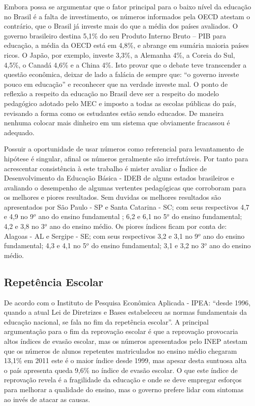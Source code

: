 \documentclass[
	article,			%
	11pt,				%
	oneside,			%
	a4paper,			%
	english,			%
	brazil,				%
	sumario=tradicional
	]{abntex2}
\begin{document}
Embora possa se argumentar que  o fator principal para o baixo nível da educação no Brasil é a falta de investimento, os números informados pela OECD atestam o contrário, que o Brasil já investe mais do que a média dos países avaliados. O governo brasileiro destina 5,1\% do seu Produto Interno Bruto – PIB para educação, a média da OECD está em 4,8\%, e abrange em sumária maioria países ricos. O Japão, por exemplo, investe 3,3\%, a Alemanha 4\%, a Coreia do Sul, 4,5\%, o Canadá 4,6\% e a China 4\%. Isto provar que o debate teve transcender a questão econômica, deixar de lado a falácia de sempre que: “o governo investe pouco em educação” e reconhecer que na verdade investe mal. O ponto de reflexão a respeito da educação no Brasil deve ser a respeito do modelo pedagógico adotado pelo MEC e imposto a todas as escolas públicas do país, revisando a forma como os estudantes estão sendo educados. De maneira nenhuma  colocar mais dinheiro em um sistema que obviamente fracassou é adequado.  

Possuir a oportunidade de usar números como referencial para levantamento de hipótese é singular, afinal os números geralmente são irrefutáveis. Por tanto para acrescentar consistência à este trabalho é mister avaliar o Índice de Desenvolvimento da Educação Básica - IDEB de alguns estados brasileiros e avaliando o desempenho de algumas vertentes pedagógicas que corroboram para os melhores e piores resultados. Sem duvidas os melhores resultados são apresentados por São Paulo - SP e Santa Catarina - SC; com seus respectivos 4,7 e 4,9 no 9$^{o}$ ano  do ensino fundamental ; 6,2 e 6,1 no 5$^{o}$ do ensino fundamental; 4,2 e 3,8 no 3$^{o}$ ano do ensino médio. Os piores índices ficam por conta de: Alagoas - AL e Sergipe - SE; com seus respectivos 3,2 e 3,1 no 9$^{o}$ ano  do ensino fundamental; 4,3 e 4,1 no 5$^{o}$ do ensino fundamental; 3,1 e 3,2 no 3$^{o}$ ano do ensino médio.

\subsection{Repetência Escolar}
 De acordo com o Instituto de Pesquisa Econômica Aplicada - IPEA: “desde 1996, quando a atual Lei de Diretrizes e Bases estabeleceu as normas fundamentais da educação nacional, se fala no fim da repetência escolar”.  A principal argumentação para o fim da reprovação escolar é que a reprovação provocaria altos índices de evasão escolar, mas os números apresentados pelo INEP atestam que os números de alunos repetentes matriculados no ensino médio chegaram 13,1\% em 2011 este é o maior índice desde 1999, mas apesar desta suntuosa alta o país apresenta queda 9,6\% no índice de evasão escolar. O que este índice de reprovação revela é a fragilidade da educação e onde se deve empregar esforços para melhorar a qualidade do ensino, mas o governo prefere lidar com sintomas ao invés de atacar as causas. 
 
\end{document}
